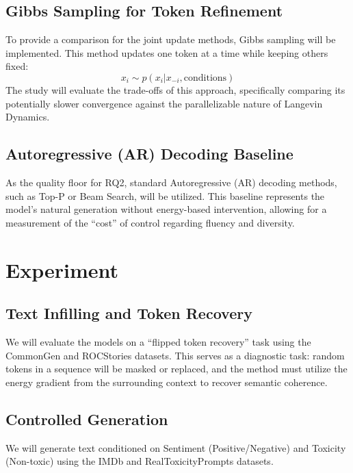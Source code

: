 \documentclass[11pt]{article}
\begin{document}
\subsection{Gibbs Sampling for Token Refinement}
To provide a comparison for the joint update methods, Gibbs sampling will be implemented. This method updates one token at a time while keeping others fixed:
$$x_i \sim p(x_i | x_{-i}, \text{conditions})$$
The study will evaluate the trade-offs of this approach, specifically comparing its potentially slower convergence against the parallelizable nature of Langevin Dynamics.

\subsection{Autoregressive (AR) Decoding Baseline}
As the quality floor for RQ2, standard Autoregressive (AR) decoding methods, such as Top-P or Beam Search, will be utilized. This baseline represents the model's natural generation without energy-based intervention, allowing for a measurement of the ``cost'' of control regarding fluency and diversity.


\section{Experiment}

\subsection{Text Infilling and Token Recovery}
We will evaluate the models on a ``flipped token recovery'' task using the CommonGen and ROCStories datasets. This serves as a diagnostic task: random tokens in a sequence will be masked or replaced, and the method must utilize the energy gradient from the surrounding context to recover semantic coherence.
\subsection{Controlled Generation}
We will generate text conditioned on Sentiment (Positive/Negative) and Toxicity (Non-toxic) using the IMDb and RealToxicityPrompts datasets.
\end{document}
